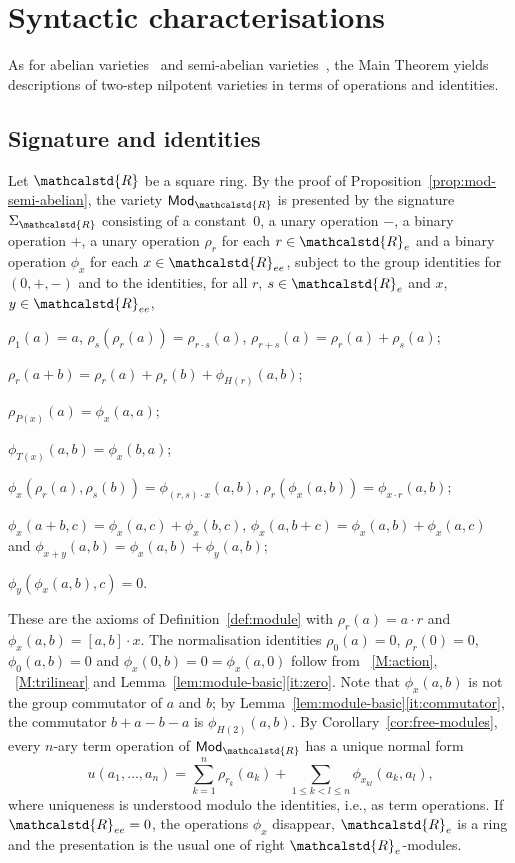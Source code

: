 \documentclass[reqno,a4paper]{amsart}
\theoremstyle{plain}
\theoremstyle{definition}
\newcommand{\R}{\ensuremath{\mathcalstd{R}}}
\newcommand{\Mod}{\ensuremath{\mathsf{Mod}}}
\renewcommand{\Re}{\ensuremath{\R_{e}}}
\newcommand{\Ree}{\ensuremath{\R_{ee}}}
\newcommand{\brk}[2]{\ensuremath{[#1,#2]}}
\begin{document}
\section{Syntactic characterisations}\label{sec:syntactic}

As for abelian varieties~\cite{Freyd} and semi-abelian varieties~\cite{BoJa}, the Main Theorem yields descriptions of two-step nilpotent varieties in terms of operations and identities.

\subsection{Signature and identities}\label{sec:signature}
Let \(\R\) be a square ring. By the proof of Proposition~\ref{prop:mod-semi-abelian}, the variety \(\Mod_{\R}\) is presented by the signature \(\Sigma_{\R}\) consisting of a constant~\(0\), a unary operation \(-\), a binary operation \(+\), a unary operation \(\rho_{r}\) for each \(r\in\Re\) and a binary operation \(\phi_{x}\) for each \(x\in\Ree\), subject to the group identities for \((0,+,-)\) and to the identities, for all \(r\), \(s\in\Re\) and \(x\), \(y\in\Ree\),
\begin{modaxioms}
  \item \(\rho_{1}(a)=a\), \(\rho_{s}(\rho_{r}(a))=\rho_{r\cdot s}(a)\), \(\rho_{r+s}(a)=\rho_{r}(a)+\rho_{s}(a)\);
  \item \(\rho_{r}(a+b)=\rho_{r}(a)+\rho_{r}(b)+\phi_{H(r)}(a,b)\);
  \item \(\rho_{P(x)}(a)=\phi_{x}(a,a)\);
  \item \(\phi_{T(x)}(a,b)=\phi_{x}(b,a)\);
  \item \(\phi_{x}(\rho_{r}(a),\rho_{s}(b))=\phi_{(r,s)\cdot x}(a,b)\), \(\rho_{r}(\phi_{x}(a,b))=\phi_{x\cdot r}(a,b)\);
  \item \(\phi_{x}(a+b,c)=\phi_{x}(a,c)+\phi_{x}(b,c)\), \(\phi_{x}(a,b+c)=\phi_{x}(a,b)+\phi_{x}(a,c)\) and \(\phi_{x+y}(a,b)=\phi_{x}(a,b)+\phi_{y}(a,b)\);
  \item \(\phi_{y}(\phi_{x}(a,b),c)=0\).
\end{modaxioms}
These are the axioms of Definition~\ref{def:module} with \(\rho_{r}(a)=a\cdot r\) and \(\phi_{x}(a,b)=\brk{a}{b}\cdot x\). The normalisation identities \(\rho_{0}(a)=0\), \(\rho_{r}(0)=0\), \(\phi_{0}(a,b)=0\) and \(\phi_{x}(0,b)=0=\phi_{x}(a,0)\) follow from ~\ref{M:action}, ~\ref{M:trilinear} and Lemma~\ref{lem:module-basic}\ref{it:zero}. Note that \(\phi_{x}(a,b)\) is not the group commutator of \(a\) and \(b\); by Lemma~\ref{lem:module-basic}\ref{it:commutator}, the commutator \(b+a-b-a\) is \(\phi_{H(2)}(a,b)\). By Corollary~\ref{cor:free-modules}, every \(n\)-ary term operation of \(\Mod_{\R}\) has a unique normal form
\begin{equation}\label{eq:normal-form-term}
  u(a_{1},\dots,a_{n})=\sum_{k=1}^{n}\rho_{r_{k}}(a_{k})+\sum_{1\leq k<l\leq n}\phi_{x_{kl}}(a_{k},a_{l})\text{,}
\end{equation}
where uniqueness is understood modulo the identities, i.e., as term operations. If \(\Ree=0\), the operations \(\phi_{x}\) disappear, \(\Re\) is a ring and the presentation is the usual one of right \(\Re\)-modules.
\end{document}

